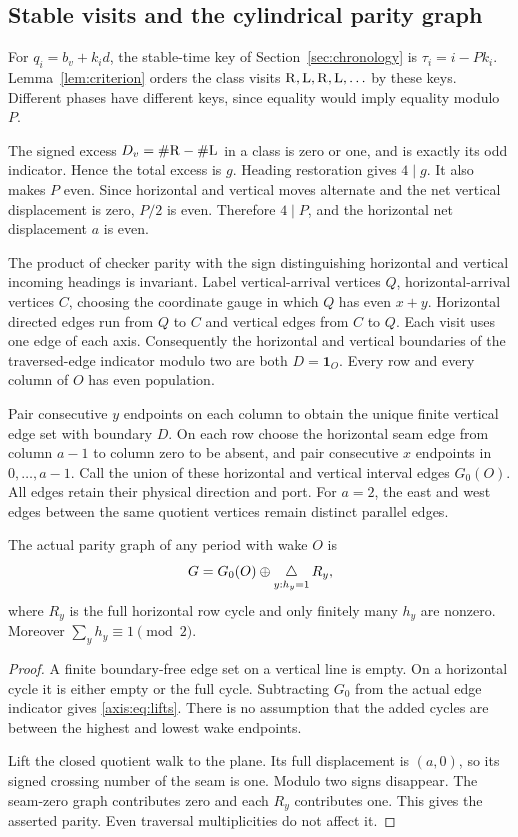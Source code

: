 \subsection{Stable visits and the cylindrical parity graph}\label{axis:sec:stable}
For $q_i=b_v+k_i d$, the stable-time key of Section~\ref{sec:chronology}
is $\tau_i=i-Pk_i$. Lemma~\ref{lem:criterion} orders the class visits
$\mathrm R,\mathrm L,\mathrm R,\mathrm L,\ldots$ by these keys. Different phases have different keys,
since equality would imply equality modulo $P$.

The signed excess $D_v=\#\mathrm R-\#\mathrm L$ in a class is zero or one, and is exactly
its odd indicator. Hence the total excess is $g$. Heading restoration gives
$4\mid g$. It also makes $P$ even. Since horizontal and vertical moves
alternate and the net vertical displacement is zero, $P/2$ is even. Therefore
$4\mid P$, and the horizontal net displacement $a$ is even.

The product of checker parity with the sign distinguishing horizontal and
vertical incoming headings is invariant. Label vertical-arrival vertices
$Q$, horizontal-arrival vertices $C$, choosing the coordinate gauge in which
$Q$ has even $x+y$. Horizontal directed edges run from $Q$ to $C$ and vertical
edges from $C$ to $Q$. Each visit uses one edge of each axis. Consequently the
horizontal and vertical boundaries of the traversed-edge indicator modulo two
are both $D=\mathbf1_O$. Every row and every column of $O$ has even population.

Pair consecutive $y$ endpoints on each column to obtain the unique finite
vertical edge set with boundary $D$. On each row choose the horizontal seam
edge from column $a-1$ to column zero to be absent, and pair consecutive $x$
endpoints in $0,\ldots,a-1$. Call the union of these horizontal and vertical
interval edges $G_0(O)$. All edges retain their physical direction and port.
For $a=2$, the east and west edges between the same quotient vertices remain
distinct parallel edges.

\begin{lemma}\label{axis:lem:lifts}
The actual parity graph of any period with wake $O$ is
\begin{equation}\label{axis:eq:lifts}
 G=G_0(O)\mathbin{\oplus}\mathop{\triangle}_{y:h_y=1}R_y,
\end{equation}
where $R_y$ is the full horizontal row cycle and only finitely many $h_y$ are
nonzero. Moreover $\sum_yh_y\equiv1\pmod2$.
\end{lemma}
\begin{proof}
A finite boundary-free edge set on a vertical line is empty. On a horizontal
cycle it is either empty or the full cycle. Subtracting $G_0$ from the actual
edge indicator gives \eqref{axis:eq:lifts}. There is no assumption that the added
cycles are between the highest and lowest wake endpoints.

Lift the closed quotient walk to the plane. Its full displacement is $(a,0)$,
so its signed crossing number of the seam is one. Modulo two signs disappear.
The seam-zero graph contributes zero and each $R_y$ contributes one. This gives
the asserted parity. Even traversal multiplicities do not affect it.
\end{proof}

